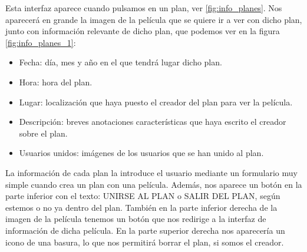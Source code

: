 Esta interfaz aparece cuando pulsamos en un plan, ver \ref{fig:info_planes}. Nos aparecerá en grande la imagen de la película que se quiere ir a ver con dicho plan, junto con información
relevante de dicho plan, que podemos ver en la figura \ref{fig:info_planes_1}:
\begin{itemize}
    \item Fecha: día, mes y año en el que tendrá lugar dicho plan.
    \item Hora: hora del plan.
    \item Lugar: localización que haya puesto el creador del plan para ver la película.
    \item Descripción: breves anotaciones características que haya escrito el creador sobre el plan.
    \item Usuarios unidos: imágenes de los usuarios que se han unido al plan.
\end{itemize}
\vspace{1cm}

La información de cada plan la introduce el usuario mediante un formulario muy simple cuando crea un plan con una película.
Además, nos aparece un botón en la parte inferior con el texto: UNIRSE AL PLAN o SALIR DEL PLAN, según estemos o no ya dentro del plan.
También en la parte inferior derecha de la imagen de la película tenemos un botón que nos redirige a la interfaz de información de dicha película.
En la parte superior derecha nos aparecería un icono de una basura, lo que nos permitirá borrar el plan, si somos el creador.

